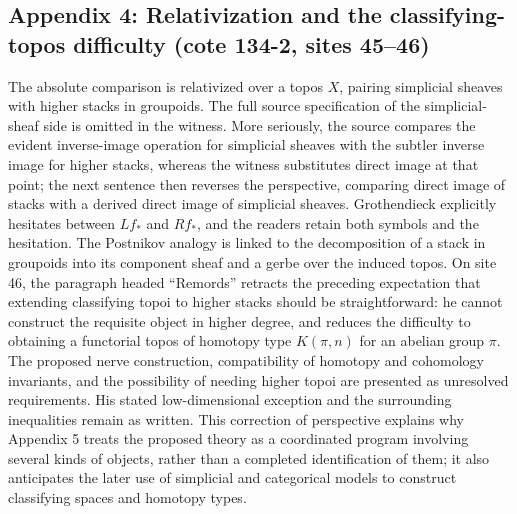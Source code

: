 \documentclass[10pt,oneside]{book}
\begin{document}
\subsection*{Appendix 4: Relativization and the classifying-topos difficulty (cote 134-2, sites 45--46)}
The absolute comparison is relativized over a topos $X$, pairing simplicial sheaves with higher stacks in groupoids. The full source specification of the simplicial-sheaf side is omitted in the witness. More seriously, the source compares the evident inverse-image operation for simplicial sheaves with the subtler inverse image for higher stacks, whereas the witness substitutes direct image at that point; the next sentence then reverses the perspective, comparing direct image of stacks with a derived direct image of simplicial sheaves. Grothendieck explicitly hesitates between $Lf_*$ and $Rf_*$, and the readers retain both symbols and the hesitation. The Postnikov analogy is linked to the decomposition of a stack in groupoids into its component sheaf and a gerbe over the induced topos. On site 46, the paragraph headed ``Remords'' retracts the preceding expectation that extending classifying topoi to higher stacks should be straightforward: he cannot construct the requisite object in higher degree, and reduces the difficulty to obtaining a functorial topos of homotopy type $K(\pi,n)$ for an abelian group $\pi$. The proposed nerve construction, compatibility of homotopy and cohomology invariants, and the possibility of needing higher topoi are presented as unresolved requirements. His stated low-dimensional exception and the surrounding inequalities remain as written. This correction of perspective explains why Appendix 5 treats the proposed theory as a coordinated program involving several kinds of objects, rather than a completed identification of them; it also anticipates the later use of simplicial and categorical models to construct classifying spaces and homotopy types.
\end{document}
